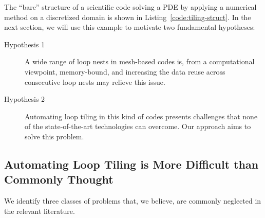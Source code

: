 The ``bare'' structure of a scientific code solving a PDE by applying a numerical method on a discretized domain is shown in Listing~\ref{code:tiling-struct}. In the next section, we will use this example to motivate two fundamental hypotheses:

\begin{description}
\item[Hypothesis 1] A wide range of loop nests in mesh-based codes is, from a computational viewpoint, memory-bound, and increasing the data reuse across consecutive loop nests may relieve this issue.
\item[Hypothesis 2] Automating loop tiling in this kind of codes presents challenges that none of the state-of-the-art technologies can overcome. Our approach aims to solve this problem.
\end{description}




\subsection{Automating Loop Tiling is More Difficult than Commonly Thought}
We identify three classes of problems that, we believe, are commonly neglected in the relevant literature. 

